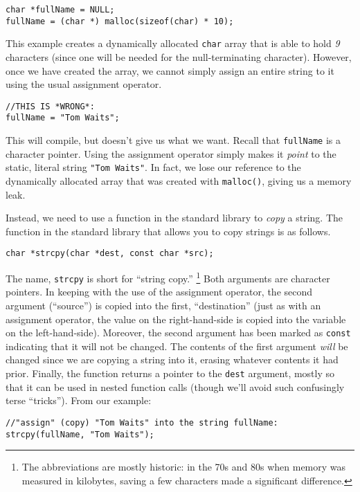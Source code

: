\begin{verbatim}
char *fullName = NULL;
fullName = (char *) malloc(sizeof(char) * 10);
\end{verbatim}

This example creates a dynamically allocated \texttt{char} array
that is able to hold \emph{9} characters (since one will be needed for
the null-terminating character).  However, once we have created the array, 
we cannot simply assign an entire string to it using the usual assignment
operator.  

\begin{verbatim}
//THIS IS *WRONG*:
fullName = "Tom Waits";
\end{verbatim}

This will compile, but doesn't give us what we want.  Recall
that \texttt{fullName} is a character pointer.  Using
the assignment operator simply makes it \emph{point} to the
static, literal string \texttt{"Tom Waits"}.  In fact, 
we lose our reference to the dynamically allocated array that
was created with \texttt{malloc()}, giving us a \gls{memory leak}.

Instead, we need to use a function in the standard library to
\emph{copy} a string.  The function in the standard library 
that allows you to copy strings is as follows.

\texttt{char *strcpy(char *dest, const char *src);}

The name, \texttt{strcpy} is short for ``string copy.''
\footnote{The abbreviations are mostly historic: in the 70s and
80s when memory was measured in kilobytes, saving a few characters
made a significant difference.} Both arguments are character
pointers.  In keeping with the use of the assignment operator, 
the second argument (``source'') is copied into
the first, ``destination'' (just as with an assignment operator, 
the value on the right-hand-side is copied into the variable on 
the left-hand-side). Moreover, the second argument has been 
marked as \texttt{const} indicating that it will not be 
changed.  The contents of the first argument \emph{will} be 
changed since we are copying a string into it, erasing whatever 
contents it had prior.  Finally, the function returns a pointer 
to the \texttt{dest} argument, mostly so that it can be
used in nested function calls (though we'll avoid such confusingly
terse ``tricks'').  From our example:

\begin{verbatim}
//"assign" (copy) "Tom Waits" into the string fullName:
strcpy(fullName, "Tom Waits");
\end{verbatim}

